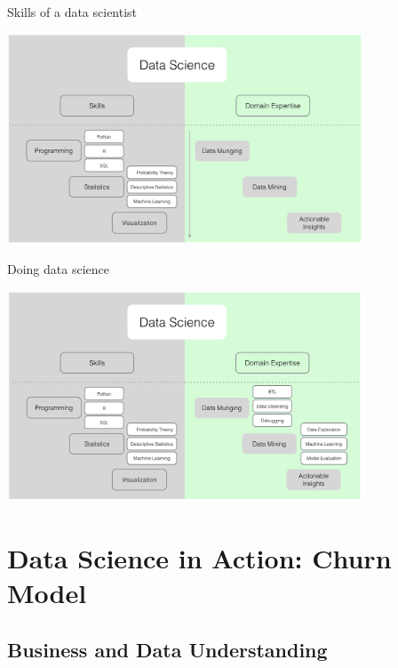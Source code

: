 \documentclass[10pt]{beamer}
\begin{document}
    \begin{frame}{Skills of a data scientist}
      \begin{center}
        \includegraphics[width=300pt]{../graphs/data_science_skills}
      \end{center}
    \end{frame}

    \begin{frame}{Doing data science}
      \begin{center}
        \includegraphics[width=300pt]{../graphs/data_science_skills_domain}
      \end{center}
    \end{frame}

\section{Data Science in Action: Churn Model}

  \subsection{Business and Data Understanding}
\end{document}
